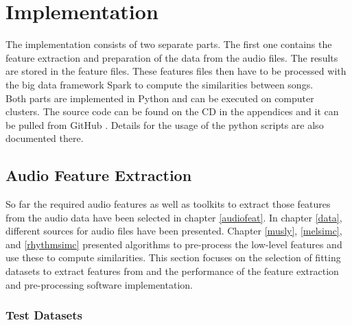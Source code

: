 
\chapter{Implementation}\label{implementationdet}

The implementation consists of two separate parts. The first one contains the feature extraction and preparation of the data from the audio files. The results are stored in the feature files. These features files then have to be processed with the big data framework Spark to compute the similarities between songs.\\ 
Both parts are implemented in Python and can be executed on computer clusters. The source code can be found on the CD in the appendices and it can be pulled from GitHub \cite{github-code}. Details for the usage of the python scripts are also documented there.

\section{Audio Feature Extraction}\label{simmet}

So far the required audio features as well as toolkits to extract those features from the audio data have been selected in chapter \ref{audiofeat}.
In chapter \ref{data}, different sources for audio files have been presented. Chapter \ref{musly}, \ref{melsimc}, and \ref{rhythmsimc} presented algorithms to pre-process the low-level features and use these to compute similarities. 
This section focuses on the selection of fitting datasets to extract features from and the performance of the feature extraction and pre-processing software implementation.  

\subsection{Test Datasets}

